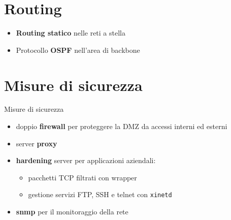 \documentclass{beamer}
\begin{document}
  \section{Routing}
  	\begin{frame}
  		\begin{itemize}
  			\item \textbf{Routing statico} nelle reti a stella
  			\item Protocollo \textbf{OSPF} nell'area di  backbone
  		\end{itemize}
  	\end{frame}
  \section{Misure di sicurezza}
  	\begin{frame}{Misure di sicurezza}
  		\begin{itemize}
  			\item doppio \textbf{firewall} per proteggere la DMZ da accessi interni ed esterni
  			\item server \textbf{proxy}
  			\item \textbf{hardening} server per applicazioni aziendali:
  			\begin{itemize}
  				\item pacchetti TCP filtrati con wrapper
  				\item gestione servizi FTP, SSH e telnet con \texttt{xinetd}
  			\end{itemize}
  			\item \textbf{snmp} per il monitoraggio della rete
  		\end{itemize}
  	\end{frame}
\end{document}
